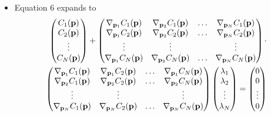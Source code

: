 \documentclass[10pt]{article}
\begin{document}
\begin{itemize}
    \item Equation 6 expands to
        \begin{eqnarray*}
            \begin{pmatrix}
                C_1({\bf p}) \\
                C_2({\bf p}) \\
                \vdots \\
                C_N({\bf p})
            \end{pmatrix}
            +
            \begin{pmatrix}
                \nabla_{{\bf p}_1} C_1({\bf p}) &  \nabla_{{\bf p}_2} C_1({\bf p}) & \hdots  & \nabla_{{\bf p}_N} C_1({\bf p}) \\
                \nabla_{{\bf p}_1} C_2({\bf p}) &  \nabla_{{\bf p}_2} C_2({\bf p}) & \hdots  & \nabla_{{\bf p}_N} C_2({\bf p}) \\
                \vdots & \vdots & & \vdots \\
                \nabla_{{\bf p}_1} C_N({\bf p})  &  \nabla_{{\bf p}_2} C_N({\bf p}) & \hdots  & \nabla_{{\bf p}_N} C_N({\bf p}) \\
            \end{pmatrix} \cdot \\
            {\vspace{6cm}}
            \begin{pmatrix}
                \nabla_{{\bf p}_1} C_1({\bf p}) &  \nabla_{{\bf p}_1} C_2({\bf p}) & \hdots  & \nabla_{{\bf p}_1} C_N({\bf p}) \\
                \nabla_{{\bf p}_2} C_1({\bf p}) &  \nabla_{{\bf p}_2} C_2({\bf p}) & \hdots  & \nabla_{{\bf p}_2} C_N({\bf p}) \\
                \vdots & \vdots & & \vdots \\
                \nabla_{{\bf p}_N} C_1({\bf p})  &  \nabla_{{\bf p}_N} C_2({\bf p}) & \hdots  & \nabla_{{\bf p}_N} C_N({\bf p}) \\
            \end{pmatrix}
            \begin{pmatrix}
                \lambda_1 \\
                \lambda_2 \\
                \vdots \\
                \lambda_N
            \end{pmatrix}
            =
            \begin{pmatrix}
                0 \\
                0 \\
                \vdots \\
                0
            \end{pmatrix}          
        \end{eqnarray*}
\end{itemize}
\end{document}
